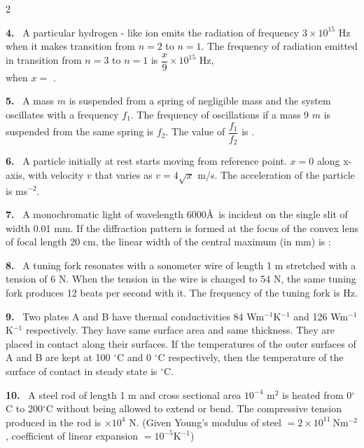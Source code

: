 \documentclass[10pt]{extarticle}
\newcommand{\qn}[1]{\par\smallskip\noindent\textbf{#1.}~}
\begin{document}
\begin{multicols}{2}
\qn{4} A particular hydrogen - like ion emits the radiation of frequency $3\times10^{15}$ Hz when it makes transition from $n=2$ to $n=1$. The frequency of radiation emitted in transition from $n=3$ to $n=1$ is $\dfrac x9\times10^{15}$ Hz,\\
when $x=$ \underline{\hspace{2em}}.

\qn{5} A mass $m$ is suspended from a spring of negligible mass and the system oscillates with a frequency $f_1$. The frequency of oscillations if a mass 9 $m$ is suspended from the same spring is $f_2$. The value of $\dfrac{f_1}{f_2}$ is \underline{\hspace{2em}}.

\qn{6} A particle initially at rest starts moving from reference point. $x=0$ along x-axis, with velocity $v$ that varies as $v=4\sqrt x$ m/s. The acceleration of the particle is \underline{\hspace{2em}} ms$^{-2}$.

\qn{7} A monochromatic light of wavelength 6000\AA\ is incident on the single slit of width 0.01 mm. If the diffraction pattern is formed at the focus of the convex lens of focal length 20 cm, the linear width of the central maximum (in mm) is :

\qn{8} A tuning fork resonates with a sonometer wire of length 1 m stretched with a tension of 6 N. When the tension in the wire is changed to 54 N, the same tuning fork produces 12 beats per second with it. The frequency of the tuning fork is \underline{\hspace{2em}} Hz.

\qn{9} Two plates A and B have thermal conductivities 84 Wm$^{-1}$K$^{-1}$ and 126 Wm$^{-1}$K$^{-1}$ respectively. They have same surface area and same thickness. They are placed in contact along their surfaces. If the temperatures of the outer surfaces of A and B are kept at 100 $^\circ$C and 0 $^\circ$C respectively, then the temperature of the surface of contact in steady state is \underline{\hspace{2em}}$^\circ$C.

\qn{10} A steel rod of length 1 m and cross sectional area $10^{-4}$ m$^2$ is heated from 0$^\circ$C to 200$^\circ$C without being allowed to extend or bend. The compressive tension produced in the rod is \underline{\hspace{2em}} $\times10^4$ N. (Given Young's modulus of steel $=2\times10^{11}\ \mathrm{Nm^{-2}}$, coefficient of linear expansion $=10^{-5}\mathrm{K^{-1}}$)


\end{multicols}
\end{document}
